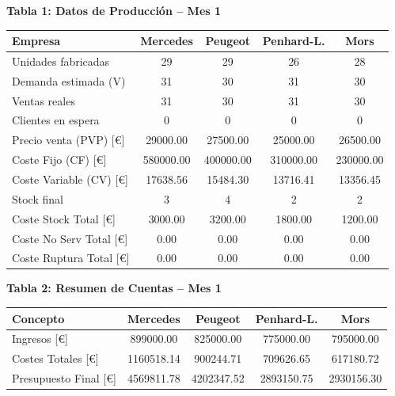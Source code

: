 \documentclass{standalone}
\begin{document}
	\leavevmode
	
	\begin{minipage}{1.08\linewidth}
		\centering
		
		\textbf{Tabla 1: Datos de Producción – Mes 1}\\[0.5em]
		\begin{tabular}{@{}l
				S[table-format=2.0]
				S[table-format=2.0]
				S[table-format=2.0]
				S[table-format=2.0]@{}}
			\toprule
			\textbf{Empresa} & \textbf{Mercedes} & \textbf{Peugeot} & \textbf{Penhard-L.} & \textbf{Mors} \\
			\midrule
			Unidades fabricadas         & 29        & 29        & 26        & 28        \\
			Demanda estimada (V)        & 31        & 30        & 31        & 30        \\
			Ventas reales               & 31        & 30        & 31        & 30        \\
			Clientes en espera          & 0         & 0         & 0         & 0         \\
			Precio venta (PVP) [\euro]  & 29000.00  & 27500.00  & 25000.00  & 26500.00  \\
			Coste Fijo (CF) [\euro]     & 580000.00 & 400000.00 & 310000.00 & 230000.00 \\
			Coste Variable (CV) [\euro] & 17638.56  & 15484.30  & 13716.41  & 13356.45  \\
			Stock final                 & 3         & 4         & 2         & 2         \\
			Coste Stock Total [\euro]   & 3000.00   & 3200.00   & 1800.00   & 1200.00   \\
			Coste No Serv Total [\euro] & 0.00      & 0.00      & 0.00      & 0.00      \\
			Coste Ruptura Total [\euro] & 0.00      & 0.00      & 0.00      & 0.00      \\
			\bottomrule
		\end{tabular}
		
		\vspace{2em}
		
		\textbf{Tabla 2: Resumen de Cuentas – Mes 1}\\[0.5em]
		\begin{tabular}{@{}l
				S[table-format=7.2]
				S[table-format=7.2]
				S[table-format=7.2]
				S[table-format=7.2]@{}}
			\toprule
			\textbf{Concepto} & \textbf{Mercedes} & \textbf{Peugeot} & \textbf{Penhard-L.} & \textbf{Mors} \\
			\midrule
			Ingresos [\euro]              & 899000.00  & 825000.00  & 775000.00  & 795000.00  \\
			Costes Totales [\euro]        & 1160518.14 & 900244.71  & 709626.65  & 617180.72  \\
			Presupuesto Final [\euro]     & 4569811.78 & 4202347.52 & 2893150.75 & 2930156.30 \\
			\bottomrule
		\end{tabular}
		
	\end{minipage}
\end{document}
